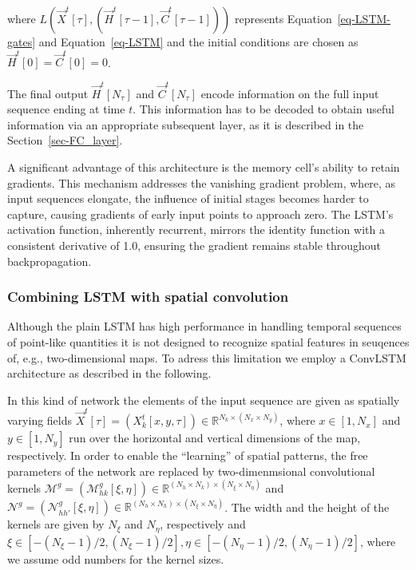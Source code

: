 \documentclass[
]{agujournal2019}
\begin{document}
where
\(L\left(\vec{X}^t[\tau], \left(\vec{H}^t[\tau-1], \vec{C}^t[\tau-1] \right) \right)\)
represents Equation~\ref{eq-LSTM-gates} and Equation~\ref{eq-LSTM} and
the initial conditions are chosen as \(\vec{H}^t[0]=\vec{C}^t[0]=0\).

The final output \(\vec{H}^t[N_\tau]\) and \(\vec{C}^t[N_\tau]\) encode
information on the full input sequence ending at time \(t\). This
information has to be decoded to obtain useful information via an
appropriate subsequent layer, as it is described in the
Section~\ref{sec-FC_layer}.

A significant advantage of this architecture is the memory cell's
ability to retain gradients. This mechanism addresses the vanishing
gradient problem, where, as input sequences elongate, the influence of
initial stages becomes harder to capture, causing gradients of early
input points to approach zero. The LSTM's activation function,
inherently recurrent, mirrors the identity function with a consistent
derivative of 1.0, ensuring the gradient remains stable throughout
backpropagation.

\subsubsection{Combining LSTM with spatial
convolution}\label{combining-lstm-with-spatial-convolution}

Although the plain LSTM has high performance in handling temporal
sequences of point-like quantities it is not designed to recognize
spatial features in seuqences of, e.g., two-dimensional maps. To adress
this limitation we employ a ConvLSTM architecture as described in the
following.

In this kind of network the elements of the input sequence are given as
spatially varying fields
\(\vec{X}^t[\tau] = (X^t_k[x,y,\tau]) \in \mathbb{R}^{N_k \times (N_x \times N_y)}\),
where \(x\in[1, N_x]\) and \(y \in [1, N_y]\) run over the horizontal
and vertical dimensions of the map, respectively. In order to enable the
``learning'' of spatial patterns, the free parameters of the network are
replaced by two-dimenmsional convolutional kernels
\(\pmb{\mathcal{M}}^{g} = (\mathcal{M}^{g}_{hk}[\xi, \eta]) \in \mathbb{R}^{(N_h \times N_k)\times (N_\xi \times N_\eta)}\)
and
\(\pmb{\mathcal{N}}^{g} = (\mathcal{N}^{g}_{hh'}[\xi, \eta]) \in \mathbb{R}^{(N_h \times N_h)\times (N_\xi \times N_\eta)}\).
The width and the height of the kernels are given by \(N_\xi\) and
\(N_\eta\), respectively and
\(\xi\in [-(N_\xi-1)/2,(N_\xi-1)/2], \eta\in [-(N_\eta-1)/2,(N_\eta-1)/2]\),
where we assume odd numbers for the kernel sizes.
\end{document}
